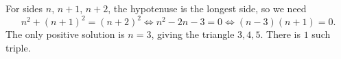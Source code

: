 For sides $n$, $n+1$, $n+2$, the hypotenuse is the longest side, so we need
\[n^2+(n+1)^2=(n+2)^2\iff n^2-2n-3=0\iff(n-3)(n+1)=0.\]
The only positive solution is $n=3$, giving the triangle $3,4,5$. There is $\boxed{1}$ such triple.
